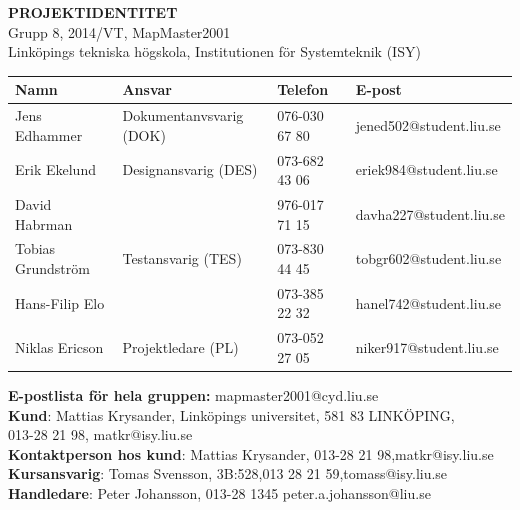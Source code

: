 \documentclass[a4paper,12pt,fleqn]{article}
\begin{document}
	\vspace*{\fill}
		\begingroup
			\begin{center}
				\LARGE{\textbf{PROJEKTIDENTITET}}
				\\
				\footnotesize
				Grupp 8, 2014/VT, MapMaster2001
				\\
				Linköpings tekniska högskola, Institutionen för Systemteknik (ISY)
				\\
				\vspace{1cm}
	  \begin{tabular}{| p{3cm} | p{4.3cm} | p{2.4cm} | p{3.8cm} |}
	    \hline
		\textbf{Namn} & \textbf{Ansvar} & \textbf{Telefon} & \textbf{E-post} \\ \hline
	    Jens Edhammer & Dokumentanvsvarig (DOK) & 076-030 67 80 & jened502@student.liu.se \\ \hline
		Erik Ekelund & Designansvarig (DES) & 073-682 43 06 & eriek984@student.liu.se \\ \hline
		David Habrman &  & 976-017 71 15 & davha227@student.liu.se \\ \hline 
		Tobias Grundström & Testansvarig (TES) & 073-830 44 45 & tobgr602@student.liu.se \\ \hline 
		Hans-Filip Elo &   & 073-385 22 32 & hanel742@student.liu.se \\ \hline 
		Niklas Ericson & Projektledare (PL) & 073-052 27 05 & niker917@student.liu.se \\ \hline
	    \end{tabular}

		\vspace{1cm}
		\textbf{E-postlista för hela gruppen:} mapmaster2001@cyd.liu.se
		\\[0.5cm]

		\textbf{Kund}: Mattias Krysander, Linköpings universitet, 581 83  LINKÖPING, \\
		013-28 21 98, matkr@isy.liu.se \\
		\textbf{Kontaktperson hos kund}: Mattias Krysander, 013-28 21 98,matkr@isy.liu.se 
		\\
		\textbf{Kursansvarig}: Tomas Svensson, 3B:528,013 28 21 59,tomass@isy.liu.se
		\\[0.5cm]
		\textbf{Handledare}: Peter Johansson, 013-28 1345 peter.a.johansson@liu.se

				\end{center}
		\endgroup
	\vspace*{\fill}
\newpage

\end{document}

